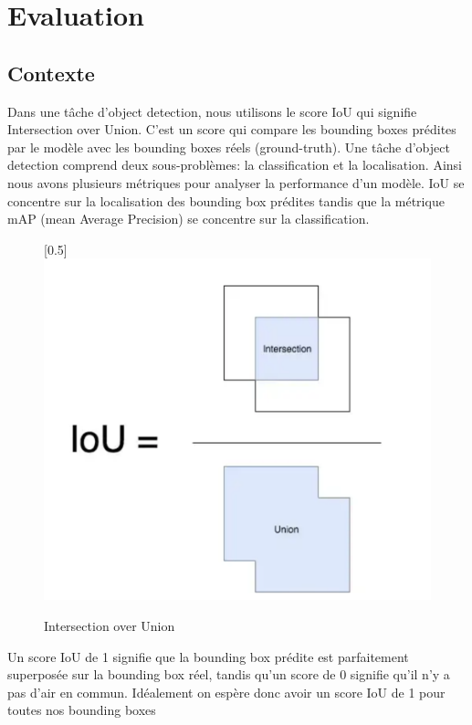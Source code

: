 \chapter{Evaluation}
\label{chap:Evaluation}

\section{Contexte}
Dans une tâche d'object detection, nous utilisons le score IoU qui signifie Intersection over Union.
C'est un score qui compare les bounding boxes prédites par le modèle avec les bounding boxes réels (ground-truth).
Une tâche d'object detection comprend deux sous-problèmes: la classification et la localisation.
Ainsi nous avons plusieurs métriques pour analyser la performance d'un modèle. IoU se concentre sur 
la localisation des bounding box prédites tandis que la métrique mAP (mean Average Precision) 
se concentre sur la classification.
\begin{figure}[bh!]
    \centering
    \scalebox{0.5}[0.5]{\includegraphics[width=\textwidth]{images/iou.png}}
    \caption{Intersection over Union}
    \label{fig:iou}
\end{figure}
Un score IoU de 1 signifie que la bounding box prédite est parfaitement superposée sur la bounding box réel, tandis qu'un score de 0 signifie qu'il n'y a pas d'air en commun. Idéalement on espère donc avoir un score IoU de 1 pour toutes nos bounding boxes


